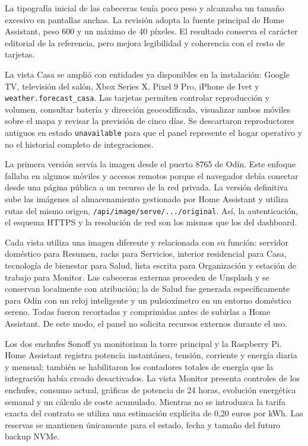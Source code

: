 La tipografía inicial de las cabeceras tenía poco peso y alcanzaba un tamaño excesivo en pantallas anchas. La revisión adopta la fuente principal de Home Assistant, peso 600 y un máximo de 40 píxeles. El resultado conserva el carácter editorial de la referencia, pero mejora legibilidad y coherencia con el resto de tarjetas.

La vista Casa se amplió con entidades ya disponibles en la instalación: Google TV, televisión del salón, Xbox Series X, Pixel 9 Pro, iPhone de Ivet y \texttt{weather.forecast\_casa}. Las tarjetas permiten controlar reproducción y volumen, consultar batería y dirección geocodificada, visualizar ambos móviles sobre el mapa y revisar la previsión de cinco días. Se descartaron reproductores antiguos en estado \texttt{unavailable} para que el panel represente el hogar operativo y no el historial completo de integraciones.

La primera versión servía la imagen desde el puerto 8765 de Odín. Este enfoque fallaba en algunos móviles y accesos remotos porque el navegador debía conectar desde una página pública a un recurso de la red privada. La versión definitiva sube las imágenes al almacenamiento gestionado por Home Assistant y utiliza rutas del mismo origen, \nolinkurl{/api/image/serve/.../original}. Así, la autenticación, el esquema HTTPS y la resolución de red son los mismos que los del dashboard.

Cada vista utiliza una imagen diferente y relacionada con su función: servidor doméstico para Resumen, racks para Servicios, interior residencial para Casa, tecnología de bienestar para Salud, lista escrita para Organización y estación de trabajo para Monitor. Las cabeceras externas proceden de Unsplash y se conservan localmente con atribución; la de Salud fue generada específicamente para Odín con un reloj inteligente y un pulsioxímetro en un entorno doméstico sereno. Todas fueron recortadas y comprimidas antes de subirlas a Home Assistant. De este modo, el panel no solicita recursos externos durante el uso.

Los dos enchufes Sonoff ya monitorizan la torre principal y la Raspberry Pi. Home Assistant registra potencia instantánea, tensión, corriente y energía diaria y mensual; también se habilitaron los contadores totales de energía que la integración había creado desactivados. La vista Monitor presenta controles de los enchufes, consumo actual, gráficas de potencia de 24 horas, evolución energética semanal y un cálculo de coste acumulado. Mientras no se introduzca la tarifa exacta del contrato se utiliza una estimación explícita de 0,20 euros por kWh. Las reservas se mantienen únicamente para el estado, fecha y tamaño del futuro backup NVMe.

